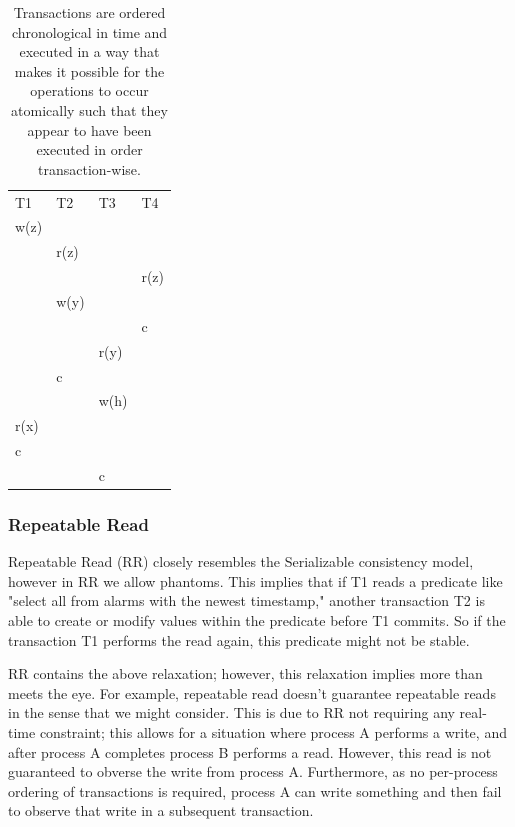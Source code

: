 \documentclass[a4paper,10pt,titlepage]{report}
\begin{document}
    \begin{table}[h]
        \begin{tabular}{l|l|l|l}
            T1   & T2   & T3   & T4   \\
            w(z) &      &      &      \\
            & r(z) &      &      \\
            &      &      & r(z) \\
            & w(y) &      &      \\
            &      &      & c    \\
            &      & r(y) &      \\
            & c    &      &      \\
            &      & w(h) &      \\
            r(x) &      &      &      \\
            c    &      &      &      \\
            &      & c    &
        \end{tabular}
        \caption{Transactions are ordered chronological in time and executed in a way that makes it possible for the operations to occur atomically such that they appear to have been executed in order transaction-wise. }
    \end{table}
    \newpage

    \subsubsection{Repeatable Read}

    Repeatable Read (RR) closely resembles the Serializable consistency model, however in RR we allow phantoms. This implies that if T1 reads a predicate like "select all from alarms with the newest timestamp," another transaction T2 is able to create or modify values within the predicate before T1 commits. So if the transaction T1 performs the read again, this predicate might not be stable.

    RR contains the above relaxation; however, this relaxation implies more than meets the eye. For example, repeatable read doesn't guarantee repeatable reads in the sense that we might consider. This is due to RR not requiring any real-time constraint; this allows for a situation where process A performs a write, and after process A completes process B performs a read. However, this read is not guaranteed to obverse the write from process A. Furthermore, as no per-process ordering of transactions is required, process A can write something and then fail to observe that write in a subsequent transaction.
\end{document}
